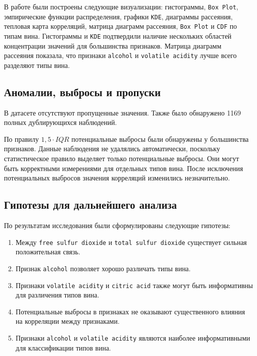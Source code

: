 В работе были построены следующие визуализации: гистограммы, \texttt{Box Plot}, эмпирические функции распределения, графики \texttt{KDE}, диаграммы рассеяния, тепловая карта корреляций, матрица диаграмм рассеяния, \texttt{Box Plot} и \texttt{CDF} по типам вина. Гистограммы и \texttt{KDE} подтвердили наличие нескольких областей концентрации значений для большинства признаков. Матрица диаграмм рассеяния показала, что признаки \texttt{alcohol} и \texttt{volatile acidity} лучше всего разделяют типы вина.
 
\subsection*{Аномалии, выбросы и пропуски}
 
В датасете отсутствуют пропущенные значения. Также было обнаружено 1169 полных дублирующихся наблюдений.
 
По правилу $1{,}5 \cdot IQR$ потенциальные выбросы были обнаружены у большинства признаков. Данные наблюдения не удалялись автоматически, поскольку статистическое правило выделяет только потенциальные выбросы. Они могут быть корректными измерениями для отдельных типов вина. После исключения потенциальных выбросов значения корреляций изменились незначительно.
 
\subsection*{Гипотезы для дальнейшего анализа}
 
По результатам исследования были сформулированы следующие гипотезы:

\begin{enumerate}
    \item Между \texttt{free sulfur dioxide} и \texttt{total sulfur dioxide} существует сильная положительная связь.
 
    \item Признак \texttt{alcohol} позволяет хорошо различать типы вина.
 
    \item Признаки \texttt{volatile acidity} и \texttt{citric acid} также могут быть информативны для различения типов вина.
 
    \item Потенциальные выбросы в признаках не оказывают существенного влияния на корреляции между признаками.
 
    \item Признаки \texttt{alcohol} и \texttt{volatile acidity} являются наиболее информативными для классификации типов вина.
 
\end{enumerate}
 
